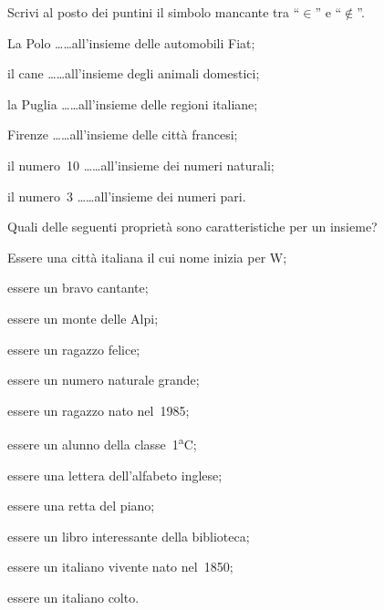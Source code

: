 \begin{esercizio}
\label{ese:\thechapter.6}
Scrivi al posto dei puntini il simbolo mancante tra ``$\in$'' e ``$\notin$''.

\begin{enumeratea}
\item La Polo \ldots\ldots all'insieme delle automobili Fiat;
\item il cane \ldots\ldots all'insieme degli animali domestici;
\item la Puglia \ldots\ldots all'insieme delle regioni italiane;
\item Firenze \ldots\ldots all'insieme delle città francesi;
\item il numero~10 \ldots\ldots all'insieme dei numeri naturali;
\item il numero~3 \ldots\ldots all'insieme dei numeri pari.
\end{enumeratea}
\end{esercizio}
\pagebreak
\begin{esercizio}
\label{ese:\thechapter.7}
Quali delle seguenti proprietà sono caratteristiche per un insieme?
\TabPositions{8.5cm}
\begin{enumeratea}
\item Essere una città italiana il cui nome inizia per W; \tab\boxV\quad\boxF
\item essere un bravo cantante; \tab\boxV\quad\boxF
\item essere un monte delle Alpi;  \tab\boxV\quad\boxF
\item essere un ragazzo felice; \tab\boxV\quad\boxF
\item essere un numero naturale grande;\tab\boxV\quad\boxF
\item essere un ragazzo nato nel~1985; \tab\boxV\quad\boxF
\item essere un alunno della classe~1\textsuperscript{a}C; \tab\boxV\quad\boxF
\item essere una lettera dell'alfabeto inglese; \tab\boxV\quad\boxF
\item essere una retta del piano; \tab\boxV\quad\boxF
\item essere un libro interessante della biblioteca; \tab\boxV\quad\boxF
\item essere un italiano vivente nato nel~1850; \tab\boxV\quad\boxF
\item essere un italiano colto. \tab\boxV\quad\boxF
\end{enumeratea}
\end{esercizio}

